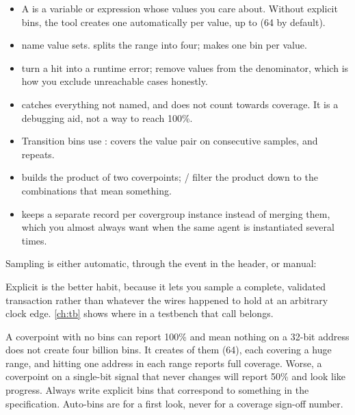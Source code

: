 \begin{itemize}
  \item A  is a variable or expression whose values you care
        about. Without explicit bins, the tool creates one automatically per
        value, up to  (64 by default).
  \item {} name value sets.  splits the
        range into four;  makes one bin per value.
  \item {} turn a hit into a runtime error; 
        remove values from the denominator, which is how you exclude
        unreachable cases honestly.
  \item {} catches everything not named, and does not count
        towards coverage. It is a debugging aid, not a way to reach 100\%.
  \item Transition bins use \code{=>}:  covers the
        value pair on consecutive samples, and \code{[*3]} repeats.
  \item {} builds the product of two coverpoints;
        / filter the product down to the
        combinations that mean something.
  \item {} keeps a separate record per covergroup
        instance instead of merging them, which you almost always want when
        the same agent is instantiated several times.
\end{itemize}

Sampling is either automatic, through the event in the 
header, or manual:


Explicit  is the better habit, because it lets you sample a
complete, validated transaction rather than whatever the wires happened to
hold at an arbitrary clock edge. \cref{ch:tb} shows where in a testbench that
call belongs.

\begin{gotcha}{A coverpoint with no bins can report 100\% and mean nothing}
 on a 32-bit address does not create four billion bins.
It creates  of them (64), each covering a huge range, and
hitting one address in each range reports full coverage. Worse, a coverpoint
on a single-bit signal that never changes will report 50\% and look like
progress. Always write explicit bins that correspond to something in the
specification. Auto-bins are for a first look, never for a coverage sign-off
number.
\end{gotcha}

